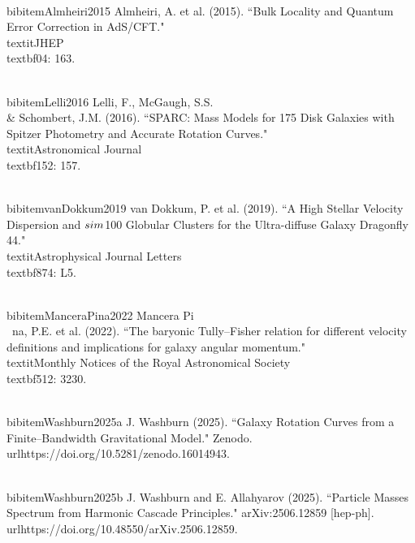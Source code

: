 \documentclass[twocolumn,prd,amsmath,amssymb,aps,superscriptaddress,nofootinbib]{revtex4-2}
\begin{document}
\begin{thebibliography}{99}
\\bibitem{Almheiri2015} Almheiri, A. et al. (2015). ``Bulk Locality and Quantum Error Correction in AdS/CFT." \\textit{JHEP} \\textbf{04}: 163.

\\bibitem{Lelli2016} Lelli, F., McGaugh, S.S. \\& Schombert, J.M. (2016). ``SPARC: Mass Models for 175 Disk Galaxies with Spitzer Photometry and Accurate Rotation Curves." \\textit{Astronomical Journal} \\textbf{152}: 157.

\\bibitem{vanDokkum2019} van Dokkum, P. et al. (2019). ``A High Stellar Velocity Dispersion and $\\sim$100 Globular Clusters for the Ultra-diffuse Galaxy Dragonfly 44." \\textit{Astrophysical Journal Letters} \\textbf{874}: L5.

\\bibitem{ManceraPina2022} Mancera Pi\\~na, P.E. et al. (2022). ``The baryonic Tully--Fisher relation for different velocity definitions and implications for galaxy angular momentum." \\textit{Monthly Notices of the Royal Astronomical Society} \\textbf{512}: 3230.

\\bibitem{Washburn2025a} J. Washburn (2025). ``Galaxy Rotation Curves from a Finite--Bandwidth Gravitational Model." Zenodo. \\url{https://doi.org/10.5281/zenodo.16014943}.

\\bibitem{Washburn2025b} J. Washburn and E. Allahyarov (2025). ``Particle Masses Spectrum from Harmonic Cascade Principles." arXiv:2506.12859 [hep-ph]. \\url{https://doi.org/10.48550/arXiv.2506.12859}.

\end{thebibliography}
\end{document}
